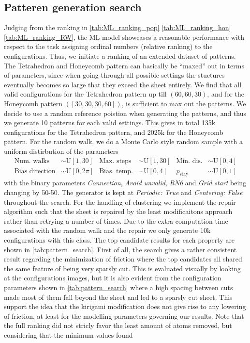 \subsection{Patteren generation search}
Judging from the ranking in \cref{tab:ML_ranking_pop} \cref{tab:ML_ranking_hon}
\cref{tab:ML_ranking_RW}, the \acrshort{ML} model showcases a reasonable
performance with respect to the task assigning ordinal numbers (relative
ranking) to the configurations. Thus, we initiate a ranking of an extended
dataset of patterns. The Tetrahedron and Honeycomb pattern can basically be
``maxed'' out in terms of parameters, since when going through all possible
settings the stuctures eventually becomes so large that they exceed the sheet
entirely. We find that all valid configurations for the Tetrahedron pattern up
till $(60, 60, 30)$, and for the Honeycomb pattern $([30, 30, 30, 60])$, is
sufficient to max out the patterns. We decide to use a random reference poistion
when generating the patterns, and thus we generate 10 patterns for each valid
settings. This gives in total 135k configurations for the Tetrahedron pattern,
and 2025k for the Honeycomb pattern. For the random walk, we do a Monte Carlo style random sample with a uniform distirbution of the parameters
\begin{align*}
  \text{Num. walks} &\sim \text{U}[1, 30] & \text{Max. steps} &\sim \text{U}[1,30]  & \text{Min. dis.} &\sim \text{U}[0,4] \\
  \text{Bias direction} &\sim \text{U}[0, 2\pi] & \text{Bias. temp.} &\sim \text{U}[0,4]  & p_{\text{stay}} &\sim \text{U}[0,1]  
\end{align*}
with the binary parameters \textit{Connection}, \textit{Avoid unvalid},
\textit{RN6} and \textit{Grid start} being changing by 50-50. The generator is
kept at \textit{Periodic: True} and \textit{Centering: False} throughout the
search. For the handling of clustering we implement the repair algorithm such
that the sheet is repaired by the least modificaitons approach rather than
retrying a number of times. Due to the extra computation time associated with
the random walk and the repair we only generate 10k configurations with this
class. The top candidate results for each property are shown in
\cref{tab:pattern_search}. First of all, the search gives a rather consistent result regarding the minimization of friction where the top candidates all shared the same feature of being very sparsly cut. This is evaluated visually by looking at the configurations images, but it is also evident from the configuration parameters shown in \cref{tab:pattern_search} where a high spacing between cuts made most of them fall beyond the sheet and led to a sparsly cut sheet. This support the idea that the kirigami modification does not give rise to any lowering of friction, at least for the modelling parameters governing our results. Note that the full ranking did not stricly favor the least amount of atoms removed, but considering that the minimum values found
